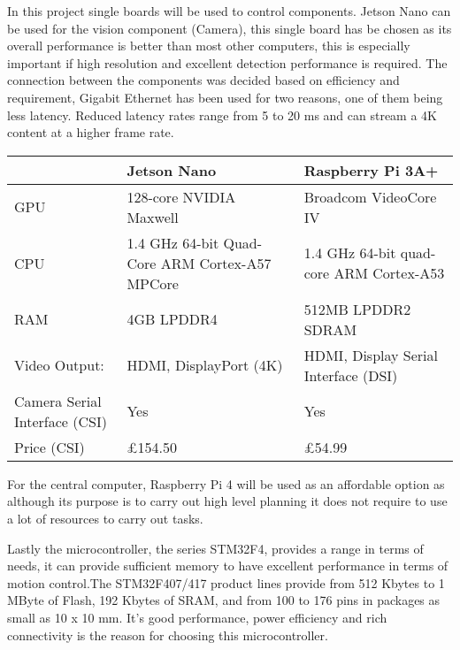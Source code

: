 \documentclass[11pt]{article}
\begin{document}
 In this project single boards will be used to control components. Jetson Nano can be used for the vision component (Camera), this single board has be chosen as its overall performance is better than most other computers, this is especially important if high resolution and excellent detection performance is required. The connection between the components was decided based on efficiency and requirement, Gigabit Ethernet has been used for two reasons, one of them being less latency. Reduced latency rates range from 5 to 20 ms and can stream a 4K content at a higher frame rate. 
 	\begin{center}
 	\setlength{\tabcolsep}{10pt} %
 	\renewcommand{\arraystretch}{1.5} %
 	\begin{tabular}{ | m{3cm} |m{3cm} | m{4cm}|  } 
 		
 			\hline
 		& Jetson Nano & Raspberry Pi 3A+   
 		\\ 
 		
 		\hline
 		
 		 GPU & 128-core NVIDIA Maxwell & Broadcom VideoCore IV  \\ 
 		
 		\hline
CPU
 		& 1.4 GHz 64-bit Quad-Core ARM Cortex-A57 MPCore & 1.4 GHz 64-bit quad-core ARM Cortex-A53
 		
 		\\ 
 		\hline
 		
 		
 		\hline
 RAM
 
 
 & 4GB LPDDR4 &
 512MB LPDDR2 SDRAM
 
 \\ 
 \hline
 		
 	Video Output: & HDMI, DisplayPort (4K) & HDMI, Display Serial Interface (DSI)
 		\\ 
 		\hline
 		Camera Serial Interface (CSI) & Yes & Yes\\ 
 		\hline
 		
 		
 		
 		\hline
 		Price (CSI) & £154.50 & £54.99\\ 
 		\hline
 	\end{tabular}
 \end{center}



For the central computer, Raspberry Pi 4 will be used as an affordable option as although its purpose is to carry out high level planning it does not require to use a lot of resources to carry out tasks.


Lastly the microcontroller, the series STM32F4, provides a range in terms of needs, it can provide sufficient memory to have excellent performance in terms of motion control.The STM32F407/417 product lines provide from 512 Kbytes to 1 MByte of Flash, 192 Kbytes of SRAM, and from 100 to
176 pins in packages as small as 10 x 10 mm. It's good performance, power efficiency and rich connectivity is the reason for choosing this microcontroller.
\end{document}
